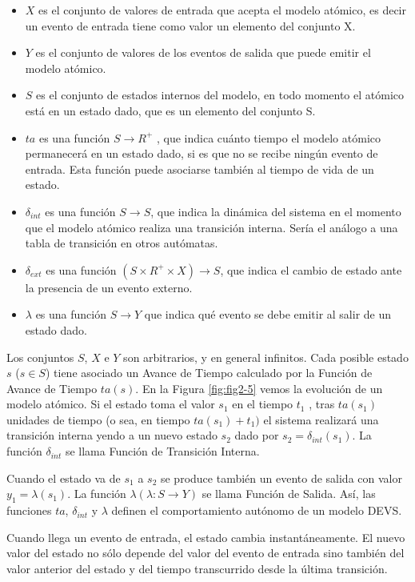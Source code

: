 \documentclass[a4paper,	11pt]{report}
\begin{document}
\begin{itemize}
\item $X$ es el conjunto de valores de entrada que acepta el modelo atómico, es decir un evento de entrada tiene como valor un elemento del conjunto X.
\item $Y$ es el conjunto de valores de los eventos de salida que puede emitir el modelo atómico.
\item $S$ es el conjunto de estados internos del modelo, en todo momento el atómico está en un estado dado, que es un elemento del conjunto S.
\item $ta$ es una función $S \to R^{+}$ , que indica cuánto tiempo el modelo atómico permanecerá en un estado dado, si es que no se recibe ningún evento de entrada. Esta función puede asociarse también al tiempo de vida de un estado.
\item $\delta_{int}$ es una función $S \to S$, que indica la dinámica del sistema en el momento que el modelo atómico realiza una transición interna. Sería el análogo a una tabla de transición en otros autómatas.
\item $\delta_{ext}$ es una función $(S \times R^{+} \times X) \to S$, que indica el cambio de estado ante la presencia de un evento externo.
\item $\lambda$ es una función $S \to Y$ que indica qué evento se debe emitir al salir de un estado dado.
\end{itemize}

Los conjuntos $S$, $X$ e $Y$ son arbitrarios, y en general infinitos. Cada posible estado $s$ ($s \in S$) tiene asociado un Avance de Tiempo calculado por la Función de Avance de Tiempo $ta(s)$.
En la Figura \ref{fig:fig2-5} vemos la evolución de un modelo atómico. Si el estado toma el valor $s_1$ en el tiempo $t_1$ , tras $ta(s_1)$ unidades de tiempo (o sea, en tiempo $ta(s_1 ) + t_1 )$ el sistema realizará una transición interna yendo a un nuevo estado $s_2$ dado por $s_2 = \delta_{int} (s_1 )$. La función $\delta_{int}$ se llama Función de Transición Interna.

Cuando el estado va de $s_1$ a $s_2$ se produce también un evento de salida con valor $y_1 = \lambda(s_1)$. La función $\lambda (\lambda : S \to Y )$ se llama Función de Salida. Así, las funciones $ta$, $\delta_{int}$ y $\lambda$ definen el comportamiento autónomo de un modelo DEVS.

Cuando llega un evento de entrada, el estado cambia instantáneamente. El nuevo valor del estado no sólo depende del valor del evento de entrada sino también del valor anterior del estado y del tiempo transcurrido desde la última transición.
\end{document}
